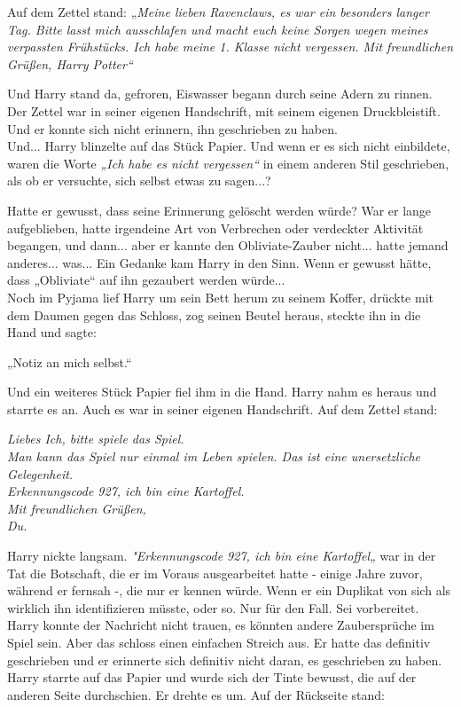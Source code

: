 {Auf dem Zettel stand: „\emph{Meine lieben Ravenclaws, es war ein besonders langer Tag. Bitte lasst mich ausschlafen und macht euch keine Sorgen wegen meines verpassten Frühstücks. Ich habe meine 1. Klasse nicht vergessen. Mit freundlichen Grüßen, Harry Potter“}

Und Harry stand da, gefroren, Eiswasser begann durch seine Adern zu rinnen. Der Zettel war in seiner eigenen Handschrift, mit seinem eigenen Druckbleistift. Und er konnte sich nicht erinnern, ihn geschrieben zu haben.\\ Und... Harry blinzelte auf das Stück Papier. Und wenn er es sich nicht einbildete, waren die Worte \emph{„Ich habe es nicht vergessen“} in einem anderen Stil geschrieben, als ob er versuchte, sich selbst etwas zu sagen...?

Hatte er gewusst, dass seine Erinnerung gelöscht werden würde? War er lange aufgeblieben, hatte irgendeine Art von Verbrechen oder verdeckter Aktivität begangen, und dann... aber er kannte den Obliviate-Zauber nicht... hatte jemand anderes... was... Ein Gedanke kam Harry in den Sinn. Wenn er gewusst hätte, dass „Obliviate“ auf ihn gezaubert werden würde...\\ Noch im Pyjama lief Harry um sein Bett herum zu seinem Koffer, drückte mit dem Daumen gegen das Schloss, zog seinen Beutel heraus, steckte ihn in die Hand und sagte:

„Notiz an mich selbst.“

Und ein weiteres Stück Papier fiel ihm in die Hand. Harry nahm es heraus und starrte es an. Auch es war in seiner eigenen Handschrift. Auf dem Zettel stand:

\emph{Liebes Ich, bitte spiele das Spiel.}\\ \emph{Man kann das Spiel nur einmal im Leben spielen. Das ist eine unersetzliche Gelegenheit.}\\ \emph{Erkennungscode 927, ich bin eine Kartoffel.}\\ \emph{Mit freundlichen Grüßen,}\\ \emph{Du.}

Harry nickte langsam. \emph{"Erkennungscode 927, ich bin eine Kartoffel„} war in der Tat die Botschaft, die er im Voraus ausgearbeitet hatte - einige Jahre zuvor, während er fernsah -, die nur er kennen würde. Wenn er ein Duplikat von sich als wirklich ihn identifizieren müsste, oder so. Nur für den Fall. Sei vorbereitet. Harry konnte der Nachricht nicht trauen, es könnten andere Zaubersprüche im Spiel sein. Aber das schloss einen einfachen Streich aus. Er hatte das definitiv geschrieben und er erinnerte sich definitiv nicht daran, es geschrieben zu haben. Harry starrte auf das Papier und wurde sich der Tinte bewusst, die auf der anderen Seite durchschien. Er drehte es um. Auf der Rückseite stand:

}
